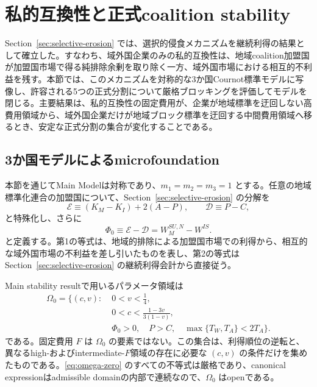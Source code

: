\section{私的互換性と正式coalition stability}
\label{sec:coalition-stability}

Section~\ref{sec:selective-erosion} では、選択的侵食メカニズムを継続利得の結果として確立した。すなわち、域外国企業のみの私的互換性は、地域coalition加盟国が加盟国市場で得る純排除余剰を取り除く一方、域外国市場における相互的不利益を残す。本節では、このメカニズムを対称的な3か国Cournot標準モデルに写像し、許容される5つの正式分割について厳格ブロッキングを評価してモデルを閉じる。主要結果は、私的互換性の固定費用が、企業が地域標準を迂回しない高費用領域から、域外国企業だけが地域ブロック標準を迂回する中間費用領域へ移るとき、安定な正式分割の集合が変化することである。

\subsection{3か国モデルによるmicrofoundation}
\label{subsec:three-country-microfoundation}

本節を通じてMain Modelは対称であり、$m_1=m_2=m_3=1$ とする。任意の地域標準化連合の加盟国について、Section~\ref{sec:selective-erosion} の分解を
\begin{equation}
    \mathscr E
    \equiv (K_M-K_I)+2(A-P),
    \qquad
    \mathscr D
    \equiv P-C,
    \label{eq:symmetric-erosion-objects}
\end{equation}
と特殊化し、さらに
\begin{equation}
    \Phi_0
    \equiv \mathscr E-\mathscr D
    =W_M^{SU,N}-W^{IS}.
    \label{eq:phi-zero}
\end{equation}
と定義する。第1の等式は、地域的排除による加盟国市場での利得から、相互的な域外国市場の不利益を差し引いたものを表し、第2の等式はSection~\ref{sec:selective-erosion} の継続利得会計から直接従う。

Main stability resultで用いるパラメータ領域は
\begin{equation}
    \boxed{
    \begin{aligned}
    \Omega_0=\{(c,v):\;&0<v<\tfrac14,\\
    &0<c<\tfrac{1-3v}{3(1-v)},\\
    &\Phi_0>0,\quad P>C,\quad \max\{T_W,T_A\}<2T_A\}.
    \end{aligned}
    }
    \label{eq:omega-zero}
\end{equation}
である。固定費用 $F$ は $\Omega_0$ の要素ではない。この集合は、利得順位の逆転と、異なるhigh-およびintermediate-$F$領域の存在に必要な $(c,v)$ の条件だけを集めたものである。\eqref{eq:omega-zero} のすべての不等式は厳格であり、canonical expressionはadmissible domainの内部で連続なので、$\Omega_0$ はopenである。

